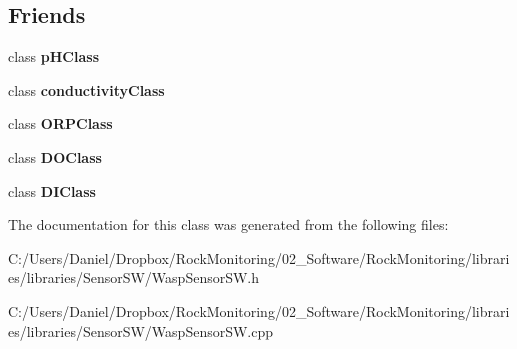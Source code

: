\subsection*{Friends}
\begin{DoxyCompactItemize}
\item 
class {\bfseries p\+H\+Class}\hypertarget{class_wasp_sensor_s_w_a923411f41dedc39b3f956e3f3325ee00}{}\label{class_wasp_sensor_s_w_a923411f41dedc39b3f956e3f3325ee00}

\item 
class {\bfseries conductivity\+Class}\hypertarget{class_wasp_sensor_s_w_aba2453a3e67655f00abaa82da5601ae1}{}\label{class_wasp_sensor_s_w_aba2453a3e67655f00abaa82da5601ae1}

\item 
class {\bfseries O\+R\+P\+Class}\hypertarget{class_wasp_sensor_s_w_a9e197b35203ff7a45c9a796abbee0f36}{}\label{class_wasp_sensor_s_w_a9e197b35203ff7a45c9a796abbee0f36}

\item 
class {\bfseries D\+O\+Class}\hypertarget{class_wasp_sensor_s_w_a8a335ba3ded6ebd99174ca196bb856ed}{}\label{class_wasp_sensor_s_w_a8a335ba3ded6ebd99174ca196bb856ed}

\item 
class {\bfseries D\+I\+Class}\hypertarget{class_wasp_sensor_s_w_ac110d8ec86c4fe7e1d7114194cfdd48d}{}\label{class_wasp_sensor_s_w_ac110d8ec86c4fe7e1d7114194cfdd48d}

\end{DoxyCompactItemize}


The documentation for this class was generated from the following files\+:\begin{DoxyCompactItemize}
\item 
C\+:/\+Users/\+Daniel/\+Dropbox/\+Rock\+Monitoring/02\+\_\+\+Software/\+Rock\+Monitoring/libraries/libraries/\+Sensor\+S\+W/Wasp\+Sensor\+S\+W.\+h\item 
C\+:/\+Users/\+Daniel/\+Dropbox/\+Rock\+Monitoring/02\+\_\+\+Software/\+Rock\+Monitoring/libraries/libraries/\+Sensor\+S\+W/Wasp\+Sensor\+S\+W.\+cpp\end{DoxyCompactItemize}
